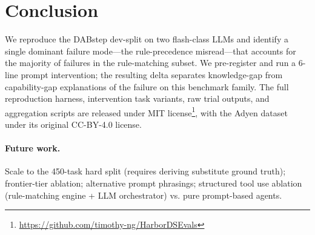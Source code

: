 \documentclass[11pt]{article}
\begin{document}
\section{Conclusion}

We reproduce the DABstep dev-split on two flash-class LLMs and identify a single dominant
failure mode---the rule-precedence misread---that accounts for the majority of failures in
the rule-matching subset. We pre-register and run a 6-line prompt intervention; the resulting
delta separates knowledge-gap from capability-gap explanations of the failure on this
benchmark family. The full reproduction harness, intervention task variants, raw trial
outputs, and aggregation scripts are released under MIT
license\footnote{\url{https://github.com/timothy-ng/HarborDSEvals}}, with the Adyen dataset
under its original CC-BY-4.0 license.

\paragraph{Future work.} Scale to the 450-task hard split (requires deriving substitute ground
truth); frontier-tier ablation; alternative prompt phrasings; structured tool use ablation
(rule-matching engine + LLM orchestrator) vs. pure prompt-based agents.



\end{document}
